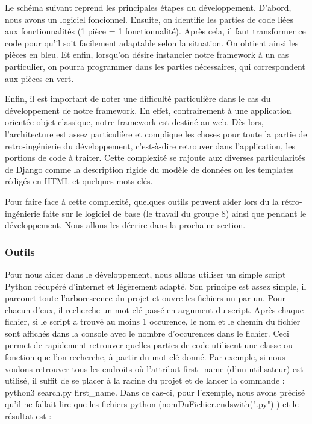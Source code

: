 Le schéma suivant reprend les principales étapes du développement.  D'abord,  nous avons un logiciel foncionnel.  Ensuite,  on identifie les parties de code liées aux fonctionnalités (1 pièce = 1 fonctionnalité).  Après cela,  il faut transformer ce code pour qu'il soit facilement adaptable selon la situation.  On obtient ainsi les pièces en bleu.  Et enfin,  lorsqu'on désire instancier notre framework à un cas particulier,  on pourra programmer dans les parties nécessaires,  qui correspondent aux pièces en vert.

\begin{center}
\end{center}

Enfin,  il est important de noter une difficulté particulière dans le cas du développement de notre framework.  En effet,  contrairement à une application orientée-objet classique,  notre framework est destiné au web.  Dès lors,  l'architecture est assez particulière et complique les choses pour toute la partie de retro-ingénierie du développement,  c'est-à-dire retrouver dans l'application,  les portions de code à traiter.  Cette complexité se rajoute aux diverses particularités de Django comme la description rigide du modèle de données ou les templates rédigés en HTML et quelques mots clés.

Pour faire face à cette complexité,  quelques outils peuvent aider lors du la rétro-ingénierie faite sur le logiciel de base (le travail du groupe 8) ainsi que pendant le développement.  Nous allons les décrire dans la prochaine section.

\subsubsection{Outils}

Pour nous aider dans le développement,  nous allons utiliser un simple script Python récupéré d'internet et légèrement adapté.  Son principe est assez simple,  il parcourt toute l'arborescence du projet et ouvre les fichiers un par un.  Pour chacun d'eux,  il recherche un mot clé passé en argument du script.  Après chaque fichier,  si le script a trouvé au moins 1 occurence,  le nom et le chemin du fichier sont affichés dans la console avec le nombre d'occurences dans le fichier.  Ceci permet de rapidement retrouver quelles parties de code utilisent une classe ou fonction que l'on recherche,  à partir du mot clé donné.  Par exemple,  si nous voulons retrouver tous les endroits où l'attribut first\_name (d'un utilisateur) est utilisé,  il suffit de se placer à la racine du projet et de lancer la commande : python3 search.py first\_name.  Dans ce cas-ci,  pour l'exemple,  nous avons précisé qu'il ne fallait lire que les fichiers python (nomDuFichier.endswith(".py") ) et le résultat est : 

